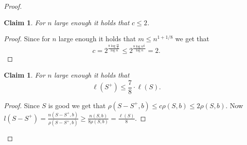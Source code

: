 \documentclass[11pt]{article} %
\newcommand{\density}[2]{\rho(#1, #2)}
\newcommand{\length}[1]{\ell(#1)}
\newcommand{\scount}[2]{n(#1, #2)}
\newtheorem{claim}[definition]{Claim}
\begin{document}
\begin{proof}
\begin{claim}
For $n$ large enough it holds that $c \leq 2$.
\end{claim}
\begin{proof}
Since for $n$ large enough it holds that $m \leq n^{1 + 1/8}$ we get that
\[
c = 2^{\frac{8\log \frac{m}{n}}{\log n}} \leq 2^{\frac{8\log n^{\frac{1}{8}}}{\log n}} = 2.
\]
\end{proof}

\begin{claim}
For $n$ large enough it holds that
\[
\length{S^+} \leq \frac{7}{8} \cdot \length{S}.
\]
\end{claim}
\begin{proof}
Since $S$ is good we get that $\density{S - S^+}{b} \leq c\density{S}{b} \leq 2\density{S}{b}$.
Now $l(S - S^+) = \frac{\scount{S - S^+}{b}}{\density{S - S^+}{b}} \geq \frac{\scount{S}{b}}{8\density{S}{b}} = \frac{\length{S}}{8}$.
\end{proof}


\end{proof}
\end{document}

